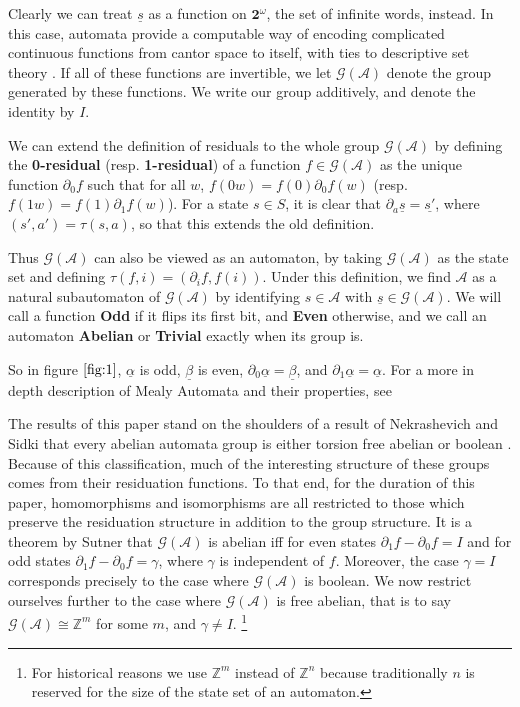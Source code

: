\documentclass[final]{ws-ijac}
\newcommand{\A}{\mathcal{A}}
\newcommand{\G}{\mathcal{G}}
\newcommand{\Z}{\mathbb{Z}}
\newcommand{\2}{\textbf{2}}
\newcommand{\del}{\partial}
\begin{document}
Clearly we can treat $\underline{s}$ as a function 
on $\2^\omega$, the set of infinite words, instead. In this case, automata 
provide a computable way of encoding complicated continuous functions from 
cantor space to itself, with ties to descriptive set theory%
\cite{skrzypczak15:descriptive}. If all of these functions are invertible, 
we let $\G(\A)$ denote the group generated by these functions. We write our
group additively, and denote the identity by $I$.

We can extend the definition of residuals to the whole group $\G(\A)$ by
defining the \textbf{0-residual} (resp. \textbf{1-residual}) of a 
function $f \in \G(\A)$ as the unique function 
$\del_0 f$ such that for all $w$, $f(0w) = f(0) \del_0 f(w)$ 
(resp. $f(1w) = f(1) \del_1 f(w)$). 
For a state $s \in S$, it is clear that 
$\del_a \underline{s} = \underline{s'}$, where $(s',a') = \tau(s,a)$, so
that this extends the old definition. 

Thus $\G(\A)$ can also be viewed as an automaton, by taking $\G(\A)$ 
as the state set and defining $\tau(f,i) = (\del_i f, f(i))$. Under this
definition, we find $\A$ as a natural subautomaton of $\G(\A)$ by identifying 
$s \in \A$ with $\underline{s} \in \G(\A)$.
We will call a function \textbf{Odd} if it flips its first bit, and 
\textbf{Even} otherwise, and we call an automaton \textbf{Abelian} or 
\textbf{Trivial} exactly when its group is. 

So in figure $\ref{fig:1}$, $\underline{\alpha}$ is odd, $\underline{\beta}$ 
is even, $\del_0 \underline{\alpha} = \underline{\beta}$, 
and $\del_1 \underline{\alpha} = \underline{\alpha}$.
For a more in depth description of Mealy Automata and their properties, 
see \cite{Sakarovitch09:automata_theory,Holcombe,SutnerLewi12:iter_inver_bin_trans}

The results of this paper stand on the shoulders of a result of Nekrashevich and 
Sidki that every abelian automata group is either torsion free abelian or 
boolean \cite{NekrashevychSidki04:automorphisms}. Because of this classification, 
much of the interesting structure of these groups comes from their residuation
functions. To that end, for the duration of this paper, 
homomorphisms and isomorphisms are all restricted to those 
which preserve the residuation structure in addition to the group structure.
It is a theorem by Sutner \cite{Sutner18:abelian_automata} 
that $\G(\A)$ is abelian iff for even states $\del_1 f - \del_0 f = I$ 
and for odd states $\del_1 f - \del_0 f = \gamma$, where $\gamma$ is 
independent of $f$. Moreover, the case $\gamma = I$ corresponds 
precisely to the case where $\G(\A)$ is boolean.
We now restrict ourselves further to the case where $\G(\A)$ is 
free abelian, that is to say $\G(\A) \cong \Z^m$ for some $m$,
and $\gamma \not = I$.%
\footnote%
{%
  For historical reasons we use $\Z^m$ instead of $\Z^n$ because 
  traditionally $n$ is reserved for the size of the state set of 
  an automaton.
}
\end{document}

